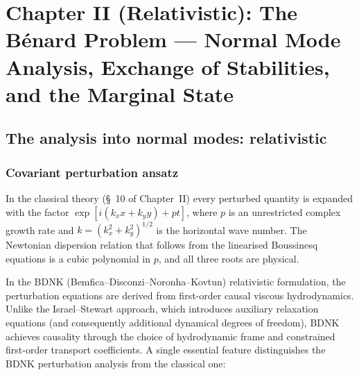 %

\chapter*{Chapter II (Relativistic): The B\'enard Problem --- Normal Mode
  Analysis, Exchange of Stabilities, and the Marginal State}

\section{The analysis into normal modes: relativistic}
\label{sec:rel-10}

\subsection{Covariant perturbation ansatz}
\label{sec:rel-10a}

In the classical theory (\S~10 of Chapter~II) every perturbed quantity is
expanded with the factor $\exp[i(k_x x + k_y y) + pt]$, where $p$ is an
unrestricted complex growth rate and $k = (k_x^2+k_y^2)^{1/2}$ is the
horizontal wave number.  The Newtonian dispersion relation that follows from
the linearised Boussinesq equations is a cubic polynomial in $p$, and all
three roots are physical.

In the BDNK (Bemfica--Disconzi--Noronha--Kovtun) relativistic formulation,
the perturbation equations are derived from first-order causal viscous
hydrodynamics.  Unlike the Israel--Stewart approach, which introduces
auxiliary relaxation equations (and consequently additional dynamical degrees
of freedom), BDNK achieves causality through the choice of hydrodynamic
frame and constrained first-order transport coefficients.  A single
essential feature distinguishes the BDNK perturbation analysis from the
classical one:

